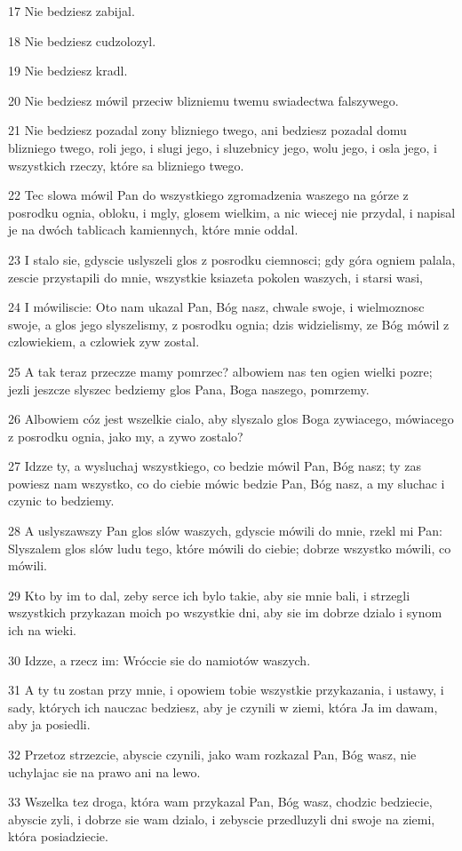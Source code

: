 \par 17 Nie bedziesz zabijal.
\par 18 Nie bedziesz cudzolozyl.
\par 19 Nie bedziesz kradl.
\par 20 Nie bedziesz mówil przeciw blizniemu twemu swiadectwa falszywego.
\par 21 Nie bedziesz pozadal zony blizniego twego, ani bedziesz pozadal domu blizniego twego, roli jego, i slugi jego, i sluzebnicy jego, wolu jego, i osla jego, i wszystkich rzeczy, które sa blizniego twego.
\par 22 Tec slowa mówil Pan do wszystkiego zgromadzenia waszego na górze z posrodku ognia, obloku, i mgly, glosem wielkim, a nic wiecej nie przydal, i napisal je na dwóch tablicach kamiennych, które mnie oddal.
\par 23 I stalo sie, gdyscie uslyszeli glos z posrodku ciemnosci; gdy góra ogniem palala, zescie przystapili do mnie, wszystkie ksiazeta pokolen waszych, i starsi wasi,
\par 24 I mówiliscie: Oto nam ukazal Pan, Bóg nasz, chwale swoje, i wielmoznosc swoje, a glos jego slyszelismy, z posrodku ognia; dzis widzielismy, ze Bóg mówil z czlowiekiem, a czlowiek zyw zostal.
\par 25 A tak teraz przeczze mamy pomrzec? albowiem nas ten ogien wielki pozre; jezli jeszcze slyszec bedziemy glos Pana, Boga naszego, pomrzemy.
\par 26 Albowiem cóz jest wszelkie cialo, aby slyszalo glos Boga zywiacego, mówiacego z posrodku ognia, jako my, a zywo zostalo?
\par 27 Idzze ty, a wysluchaj wszystkiego, co bedzie mówil Pan, Bóg nasz; ty zas powiesz nam wszystko, co do ciebie mówic bedzie Pan, Bóg nasz, a my sluchac i czynic to bedziemy.
\par 28 A uslyszawszy Pan glos slów waszych, gdyscie mówili do mnie, rzekl mi Pan: Slyszalem glos slów ludu tego, które mówili do ciebie; dobrze wszystko mówili, co mówili.
\par 29 Kto by im to dal, zeby serce ich bylo takie, aby sie mnie bali, i strzegli wszystkich przykazan moich po wszystkie dni, aby sie im dobrze dzialo i synom ich na wieki.
\par 30 Idzze, a rzecz im: Wróccie sie do namiotów waszych.
\par 31 A ty tu zostan przy mnie, i opowiem tobie wszystkie przykazania, i ustawy, i sady, których ich nauczac bedziesz, aby je czynili w ziemi, która Ja im dawam, aby ja posiedli.
\par 32 Przetoz strzezcie, abyscie czynili, jako wam rozkazal Pan, Bóg wasz, nie uchylajac sie na prawo ani na lewo.
\par 33 Wszelka tez droga, która wam przykazal Pan, Bóg wasz, chodzic bedziecie, abyscie zyli, i dobrze sie wam dzialo, i zebyscie przedluzyli dni swoje na ziemi, która posiadziecie.

